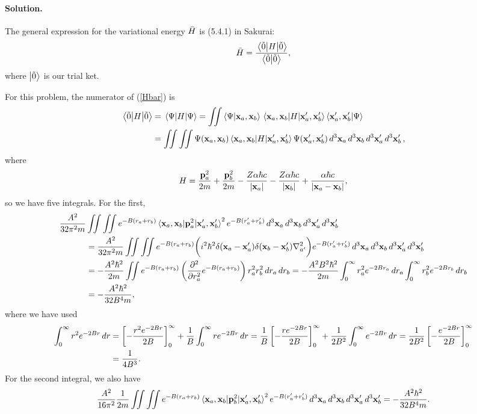 \documentclass[11pt]{article}
\newcommand{\refeq}[1]{(\ref{#1})}
\newcommand{\beq}{\begin{equation*}}
\newcommand{\eeq}{\end{equation*}}
\newcommand{\beqn}{\begin{equation}}
\newcommand{\eeqn}{\end{equation}}
\newenvironment{solution}
{
    \paragraph{Solution.}
    \ignorespaces
}
{
}
\begin{document}
\begin{solution}
	The general expression for the variational energy $\bar{H}$ is (5.4.1) in Sakurai:
	\beqn \label{Hbar}
		\Hbar = \frac{\ev{H}{\ot}}{\braket{\ot}},
	\eeqn
	where $\ket{\tilde{0}}$ is our trial ket.
	
	For this problem, the numerator of \refeq{Hbar} is
	\begin{align*}
		\ev{H}{\ot} &= \ev{H}{\Psi}
		= \iint \braket{\Psi}{\vxa, \vxb} \mel{\vxa, \vxb}{H}{\vxa', \vxb'} \braket{\vxa', \vxb'}{\Psi} \\
		&= \iint \iint \Psi(\vxa, \vxb) \mel{\vxa, \vxb}{H}{\vxa', \vxb'} \Psi(\vxa', \vxb') \dcxa \dcxb \dcxap \dcxbp,
	\end{align*}
	where
	\beq
		H = \frac{\vpa^2}{2m} + \frac{\vpb^2}{2m} - \frac{Z \alp \hbar c}{\abs{\vxa}} - \frac{Z \alp \hbar c}{\abs{\vxb}} + \frac{\alp \hbar c}{\abs{\vxa - \vxb}},
	\eeq
	so we have five integrals.  For the first,
	\begin{align*}
		\frac{A^2}{32 \pi^2 m} &\iint \iint e^{-B(\ra + \rb)} \mel{\vxa, \vxb}{\vpa^2}{\vxa', \vxb'}^2 e^{-B(\ra' + \rb')} \dcxa \dcxb \dcxap \dcxbp \\
		&= \frac{A^2}{32 \pi^2 m} \iint \iint e^{-B(\ra + \rb)} \bigg( i^2 \hbar^2 \delta(\vxa - \vxa') \delta(\vxb - \vxb') \laplacian_{a'} \bigg) e^{-B(\ra' + \rb')} \dcxa \dcxb \dcxap \dcxbp \\
		&= -\frac{A^2 \hbar^2}{2 m} \iint e^{-B(\ra + \rb)} \left( \pdv[2]{}{\ra} e^{-B(\ra + \rb)} \right) \ra^2 \rb^2 \dra \drb
		= -\frac{A^2 B^2 \hbar^2}{2 m} \intoi \ra^2 e^{-2 B \ra} \dra \intoi \rb^2 e^{-2 B \rb} \drb \\
		&= -\frac{A^2 \hbar^2}{32 B^4 m},
	\end{align*}
	where we have used
	\begin{align*}
		\int_0^\infty r^2 e^{-2B r} \dd{r} &= \left[ -\frac{r^2 e^{-2 B r}}{2 B} \right]_0^\infty + \frac{1}{B} \int_0^\infty r e^{-2 B r} \dd{r}
		= \frac{1}{B} \left[ -\frac{r e^{-2 B r}}{2 B} \right]_0^\infty + \frac{1}{2 B^2} \int_0^\infty e^{-2 B r} \dd{r}
		= \frac{1}{2 B^2} \left[ -\frac{e^{-2 B r}}{2 B} \right]_0^\infty \\
		&= \frac{1}{4 B^3}.
	\end{align*}
	For the second integral, we also have
	\beq
		\frac{A^2}{16 \pi^2} \frac{1}{2 m} \iint \iint e^{-B(\ra + \rb)} \mel{\vxa, \vxb}{\vpb^2}{\vxa', \vxb'}^2 e^{-B(\ra' + \rb')} \dcxa \dcxb \dcxap \dcxbp = -\frac{A^2 \hbar^2}{32 B^4 m}.
	\eeq
	

\end{solution}
\end{document}
